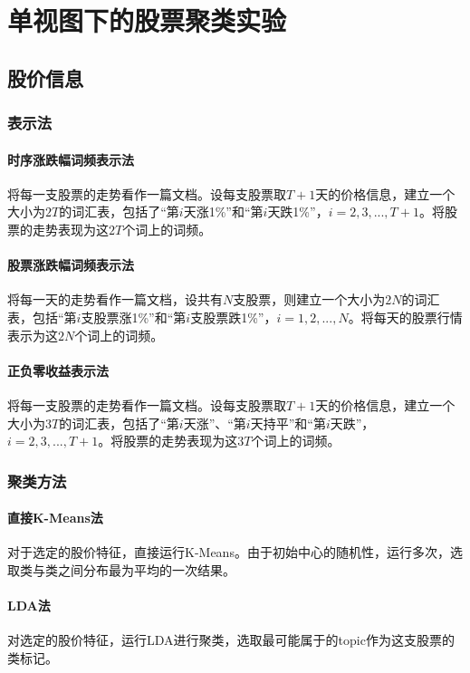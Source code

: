 \documentclass[12pt]{article}
\begin{document}
\section{单视图下的股票聚类实验}
\subsection{股价信息}
\subsubsection{表示法}
\paragraph{时序涨跌幅词频表示法}
将每一支股票的走势看作一篇文档。设每支股票取$T+1$天的价格信息，建立一个大小为$2T$的词汇表，包括了“第$i$天涨1\%”和“第$i$天跌1\%”，$i=2,3,...,T+1$。将股票的走势表现为这$2T$个词上的词频。

\paragraph{股票涨跌幅词频表示法}
将每一天的走势看作一篇文档，设共有$N$支股票，则建立一个大小为$2N$的词汇表，包括“第$i$支股票涨1\%”和“第$i$支股票跌1\%”，$i=1,2,...,N$。将每天的股票行情表示为这$2N$个词上的词频。

\paragraph{正负零收益表示法}
将每一支股票的走势看作一篇文档。设每支股票取$T+1$天的价格信息，建立一个大小为$3T$的词汇表，包括了“第$i$天涨”、“第$i$天持平”和“第$i$天跌”，$i=2,3,...,T+1$。将股票的走势表现为这$3T$个词上的词频。

\subsubsection{聚类方法}
\label{SSSAggregationMethods}
\paragraph{直接K-Means法}
对于选定的股价特征，直接运行K-Means。由于初始中心的随机性，运行多次，选取类与类之间分布最为平均的一次结果。

\paragraph{LDA法}
对选定的股价特征，运行LDA进行聚类，选取最可能属于的topic作为这支股票的类标记。
\end{document}
